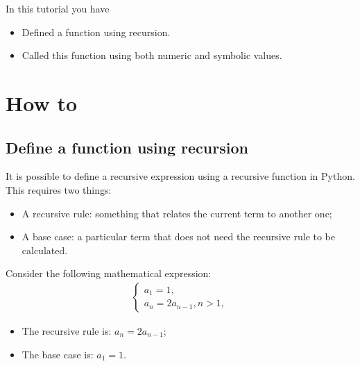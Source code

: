 \begin{note}
In this tutorial you have
\begin{itemize}
\item 

Defined a function using recursion.

\item 

Called this function using both numeric and symbolic values.

\end{itemize}
\end{note}





\section{How to}
\label{\detokenize{tools-for-mathematics/07-sequences/how/main:how}}\label{\detokenize{tools-for-mathematics/07-sequences/how/main::doc}}

\subsection{Define a function using recursion}
\label{\detokenize{tools-for-mathematics/07-sequences/how/main:define-a-function-using-recursion}}

It is possible to define a recursive expression using a recursive function in
Python. This requires two things:
\begin{itemize}
\item 

A recursive rule: something that relates the current term to another one;

\item 

A base case: a particular term that does not need the recursive rule to be
calculated.

\end{itemize}


Consider the following mathematical expression:
\begin{equation*}
\begin{split}
    \left\{
    \begin{array}{l}
        a_1 = 1,\\
        a_n = 2a_{n - 1}, n > 1,
    \end{array}
    \right.
\end{split}
\end{equation*}\begin{itemize}
\item 

The recursive rule is: \(a_n = 2a_{n - 1}\);

\item 

The base case is: \(a_1 = 1\).

\end{itemize}


